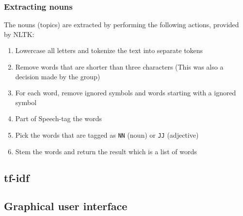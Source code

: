 \subsubsection{Extracting nouns}

The nouns (topics) are extracted by performing the following actions, provided
by NLTK:

\begin{enumerate}
    \item Lowercase all letters and tokenize the text into separate tokens
    \item Remove words that are shorter than three characters (This was also a
          decision made by the group)
    \item For each word, remove ignored symbols and words starting with a
	    ignored symbol
    \item Part of Speech-tag \cite{pos} the words
    \item Pick the words that are tagged as \texttt{NN} (noun) or \texttt{JJ}
        (adjective)
    \item Stem the words and return the result which is a list of words
\end{enumerate}



\subsection{tf-idf}



\subsection{Graphical user interface}
